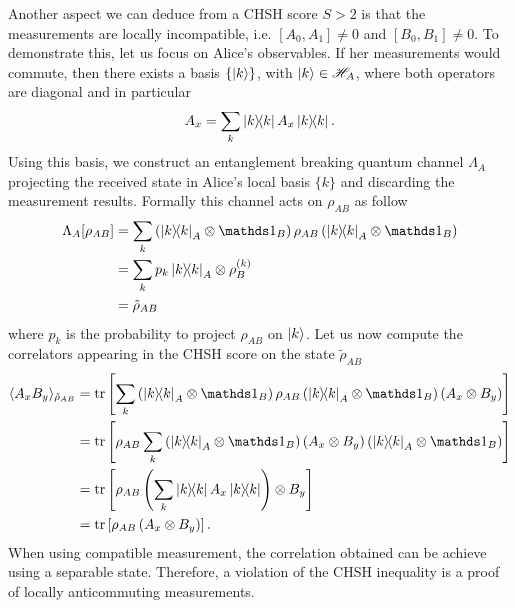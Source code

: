 Another aspect we can deduce from a CHSH score $S>2$ is that the measurements are locally incompatible, i.e. $[A_0,A_1] \neq 0$ and $[B_0,B_1] \neq 0$.
To demonstrate this, let us focus on Alice's observables. 
If her measurements would commute, then there exists a basis $\{\ket{k}\}$, with $\ket{k}\in \mathscr{H}_A$, where both operators are diagonal and in particular
\begin{equation}
	\begin{split}
		A_x = \sum_k \ketbra{k} A_x \ketbra{k}.
	\end{split}	
\end{equation}
Using this basis, we construct an entanglement breaking quantum channel $\Lambda_A$ projecting the received state in Alice's local basis $\{k\}$ and discarding the measurement results. 
Formally this channel acts on $\rho_{AB}$ as follow
\begin{equation}
	\begin{split}
		\Lambda_A[\rho_{AB}] &= \sum_k \left(\ketbra{k}_A \otimes \id_B \right)\rho_{AB}	\left(\ketbra{k}_A \otimes \id_B \right) \\
							 &= \sum_k p_k \ketbra{k}_A \otimes \rho_B^{(k)} \\
							 &= \tilde{\rho}_{AB} 
	\end{split}
\end{equation}
where $p_k$ is the probability to project $\rho_{AB}$ on $\ket{k}$.
Let us now compute the correlators appearing in the CHSH score on the state $\tilde{\rho}_{AB}$
\begin{equation}
	\begin{split}
		\mean{A_x B_y}_{\tilde{\rho}_{AB}} &= \trr{\sum_k \left(\ketbra{k}_A \otimes \id_B \right)\rho_{AB}	\left(\ketbra{k}_A \otimes \id_B \right) \left(A_x \otimes B_y\right) } \\
					   &= \trr{\rho_{AB} \sum_k \left(\ketbra{k}_A \otimes \id_B \right)\left(A_x \otimes B_y\right)\left(\ketbra{k}_A \otimes \id_B \right)  } \\	
					   &= \trr{\rho_{AB}\left(\sum_k \ketbra{k}A_x \ketbra{k}\right) \otimes B_y} \\
					   &= \trr{\rho_{AB}\left(A_x \otimes B_y\right)}.
	\end{split}
\end{equation}
When using compatible measurement, the correlation obtained can be achieve using a separable state.
Therefore, a violation of the CHSH inequality is a proof of locally anticommuting measurements.

\medbreak


